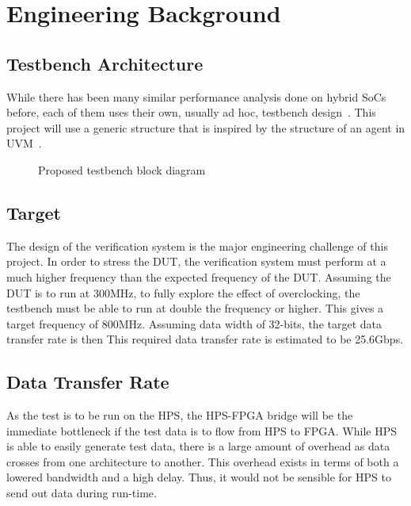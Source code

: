 \section{Engineering Background}

\subsection{Testbench Architecture}

While there has been many similar performance analysis done on hybrid SoCs
before, each of them uses their own, usually ad hoc, testbench
design~\cite{Shi1}.
This project will use a generic structure that is inspired by the structure of
an agent in UVM~\cite{Accellera1}.

\begin{figure}[H]
  \centering
  
  \caption{Proposed testbench block diagram}
  \label{Block}
\end{figure}

\subsection{Target}
The design of the verification system is the major engineering challenge of this
project.
In order to stress the DUT, the verification system must perform at a much
higher frequency than the expected frequency of the DUT.
Assuming the DUT is to run at 300MHz, to fully explore the effect of
overclocking, the testbench must be able to run at double the frequency or
higher.
This gives a target frequency of 800MHz.
Assuming data width of 32-bits, the target data transfer rate is then 
This required data transfer rate is estimated to be 25.6Gbps.

\subsection{Data Transfer Rate}
As the test is to be run on the HPS, the HPS-FPGA bridge will be the
immediate bottleneck if the test data is to flow from HPS to FPGA.
While HPS is able to easily generate test data,
there is a large amount of overhead as data crosses from one architecture
to another.
This overhead exists in terms of both a lowered bandwidth and a high delay.
Thus, it would not be sensible for HPS to send out data during run-time.

